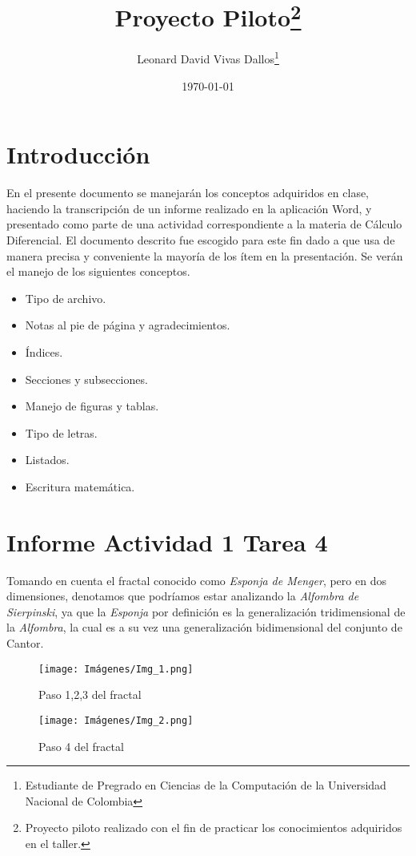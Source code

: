 \documentclass[12pt]{article}
\title{Proyecto Piloto\thanks{Proyecto piloto realizado con el fin de practicar los conocimientos adquiridos en el taller.}}
\author{Leonard David Vivas Dallos\thanks{Estudiante de Pregrado en Ciencias de la Computación de la Universidad Nacional de Colombia}}
\date{\today}
\begin{document}
\maketitle

\tableofcontents

\section{Introducción}
En el presente documento se manejarán los conceptos adquiridos en clase, haciendo la transcripción de un informe realizado en la aplicación Word, y presentado como parte de una actividad correspondiente a la materia de Cálculo Diferencial. El documento descrito fue escogido para este fin dado a que usa de manera precisa y conveniente la mayoría de los ítem en la presentación. Se verán el manejo de los siguientes conceptos.

\begin{itemize}
    \item Tipo de archivo.
    \item Notas al pie de página y agradecimientos.
    \item Índices.
    \item Secciones y subsecciones.
    \item Manejo de figuras y tablas.
    \item Tipo de letras.
    \item Listados.
    \item Escritura matemática.
\end{itemize}

\section{Informe Actividad 1 Tarea 4}
Tomando en cuenta el fractal conocido como \textit{Esponja de Menger}, pero en dos dimensiones, denotamos que podríamos estar analizando la \textit{Alfombra de Sierpinski}, ya que la \textit{Esponja} por definición es la generalización tridimensional de la \textit{Alfombra}, la cual es a su vez una generalización bidimensional del conjunto de Cantor.

\begin{figure}[H]
    \centering
    \texttt{[image: Imágenes/Img\_1.png]}
    \caption{Paso 1,2,3 del fractal}
    \label{Img_1}
\end{figure}
\begin{figure}[H]
    \centering
    \texttt{[image: Imágenes/Img\_2.png]}
    \caption{Paso 4 del fractal}
    \label{Img_2}
\end{figure}
\end{document}
